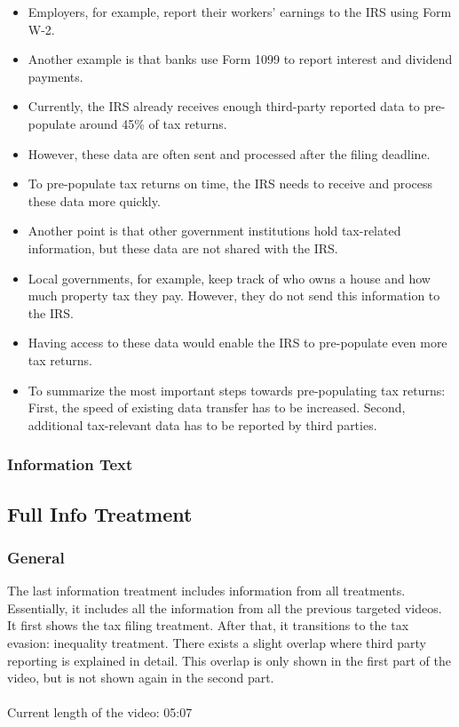 \documentclass[11pt]{article}
\newcommand{\tk}[1]{\textcolor{orange}{#1}}
\begin{document}
\begin{itemize}
    \item Employers, for example, report their workers’ earnings to the IRS using Form W-2.  
    \item Another example is that banks use Form 1099 to report interest and dividend payments. 
    \item Currently, the IRS already receives enough third-party reported data to pre-populate around 45\% of tax returns. 
    \item However, these data are often sent and processed after the filing deadline.
    \item To pre-populate tax returns on time, the IRS needs to receive and process these data more quickly. 
    \item Another point is that other government institutions hold tax-related information, but these data are not shared with the IRS. 
    \item Local governments, for example, keep track of who owns a house and how much property tax they pay. However, they do not send this information to the IRS. 
    \item Having access to these data would enable the IRS to pre-populate even more tax returns. 
    \item To summarize the most important steps towards pre-populating tax returns: 
    First, the speed of existing data transfer has to be increased. Second, additional tax-relevant data has to be reported by third parties.
\end{itemize}

\subsubsection*{Information Text}
\subsection{Full Info Treatment}
\subsubsection*{General}
The last information treatment includes information from all treatments. Essentially, it includes all the information from all the previous targeted videos. It first shows the tax filing treatment. After that, it transitions to the tax evasion: inequality treatment. There exists a slight overlap where third party reporting is explained in detail. This overlap is only shown in the first part of the video, but is not shown again in the second part.  
\\ \\
Current length of the video: 05:07
\end{document}
